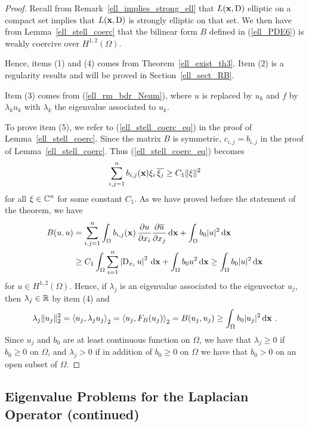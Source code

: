 \begin{proof}
Recall from Remark~\ref{ell_implies_strong_ell} that
$L(\mathbf{x},\operatorname{D})$ elliptic on a compact set implies that
$L(\mathbf{x},\operatorname{D})$ is strongly elliptic on that set.
We then have from Lemma~\ref{ell_stell_coerc} that the bilinear form $B$
defined in (\ref{ell_PDE6}) is weakly coercive over
$\displaystyle H^{1,2}(\Omega)$.

Hence, items (1) and (4) comes from
Theorem~\ref{ell_exist_th3}.  Item (2) is a
regularity results and will be proved in Section~\ref{ell_sect_RB}.

Item (3) comes from (\ref{ell_rm_bdr_Neum}),
where $u$ is replaced by $u_k$ and $f$ by $\lambda_k u_k$ with
$\lambda_k$ the eigenvalue associated to $u_k$.

To prove item (5), we refer to
(\ref{ell_stell_coerc_eq}) in the proof of
Lemma~\ref{ell_stell_coerc}.  Since the matrix $B$ is
symmetric, $c_{i,j} = b_{i,j}$ in the proof of
Lemma~\ref{ell_stell_coerc}.  Thus (\ref{ell_stell_coerc_eq}) becomes
\[
\sum_{i,j=1}^n b_{i,j}(\mathbf{x}) \xi_i\,\overline{\xi_j} \geq C_1
\|\mathbf{\xi}\|^2 
\]
for all $\displaystyle \mathbf{\xi} \in \mathbb{C}^n$ for some constant $C_1$.
As we have proved before the statement of the theorem, we have
\begin{align*}
B(u,u) &= \sum_{i,j=1}^n \int_\Omega b_{i,j}(\mathbf{x}) \,\frac{\partial{u}}{\partial x_i}
\frac{\partial{\overline{u}}}{\partial x_j}\,\mathrm{d}{\mathbf{x}} + \int_\Omega b_0 |u|^2 \,\mathrm{d}{\mathbf{x}} \\
&\geq C_1 \int_\Omega \sum_{i=1}^n \left| \operatorname{D}_{x_i} u \right|^2 \,\mathrm{d}{\mathbf{x}}
+ \int_\Omega b_0 u^2 \,\mathrm{d}{\mathbf{x}} \geq \int_\Omega b_0 |u|^2 \,\mathrm{d}{\mathbf{x}}
\end{align*}
for $\displaystyle u \in H^{1,2}(\Omega)$.
Hence, if $\lambda_j$ is an eigenvalue associated to the eigenvector
$u_j$, then $\lambda_j \in \mathbb{R}$ by item (4) and
\[
\lambda_j \|u_j\|_2^2 = \left\langle{u_j} , {\lambda_j u_j}\right\rangle_2
= \left\langle{u_j} , {F_B(u_j)}\right\rangle_2 = B(u_j,u_j)
\geq \int_\Omega b_0 |u_j|^2 \,\mathrm{d}{\mathbf{x}} \ .
\]
Since $u_j$ and $b_0$ are at least continuous function on $\Omega$, we
have that $\lambda_j \geq 0$ if $b_0\geq 0$ on $\Omega$, and $\lambda_j>0$
if in addition of $b_0\geq 0$ on $\Omega$ we have that $b_0> 0$ on an
open subset of $\Omega$.
\end{proof}

\subsection{Eigenvalue Problems for the Laplacian Operator
(continued)} \label{subsectEigLaplace}

